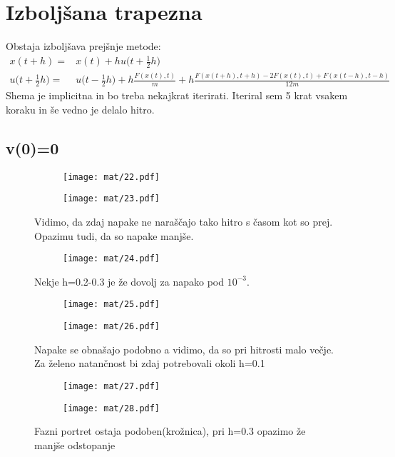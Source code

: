 \documentclass{article}
\begin{document}
\section{Izboljšana trapezna}

Obstaja izboljšava prejšnje metode:
\begin{align*}
x(t+h) =& x(t) + h u\Big(t+\frac{1}{2}h\Big) \\
u\Big(t+\frac{1}{2}h\Big) =& u\Big(t-\frac{1}{2}h\Big) + h\frac{F(x(t),t)}{m} + h\frac{F(x(t+h),t+h) - 2F(x(t),t) + F(x(t-h),t-h)}{12m}
\end{align*}
Shema je implicitna in bo treba nekajkrat iterirati. Iteriral sem 5 krat vsakem koraku in še vedno je delalo hitro.

\subsection{v(0)=0}
\begin{figure}[H]
\begin{subfigure}{.5\textwidth}
\texttt{[image: mat/22.pdf]}
\end{subfigure}
\begin{subfigure}{.5\textwidth}
\texttt{[image: mat/23.pdf]}
\end{subfigure}
\caption*{Vidimo, da zdaj napake ne naraščajo tako hitro s časom kot so prej. Opazimu tudi, da so napake manjše.}
\end{figure}

\begin{figure}[H]
\centering
\begin{subfigure}{.5\textwidth}
\texttt{[image: mat/24.pdf]}
\end{subfigure}
\caption*{Nekje h=0.2-0.3 je že dovolj za napako pod $10^{-3}$.}
\end{figure}

\begin{figure}[H]
\begin{subfigure}{.5\textwidth}
\texttt{[image: mat/25.pdf]}
\end{subfigure}
\begin{subfigure}{.5\textwidth}
\texttt{[image: mat/26.pdf]}
\end{subfigure}
\caption*{Napake se obnašajo podobno a vidimo, da so pri hitrosti malo večje. Za želeno natančnost bi zdaj potrebovali okoli h=0.1}
\end{figure}

\begin{figure}[H]
\begin{subfigure}{.5\textwidth}
\texttt{[image: mat/27.pdf]}
\end{subfigure}
\begin{subfigure}{.5\textwidth}
\texttt{[image: mat/28.pdf]}
\end{subfigure}
\caption*{Fazni portret ostaja podoben(krožnica), pri h=0.3 opazimo že manjše odstopanje}
\end{figure}
\end{document}
